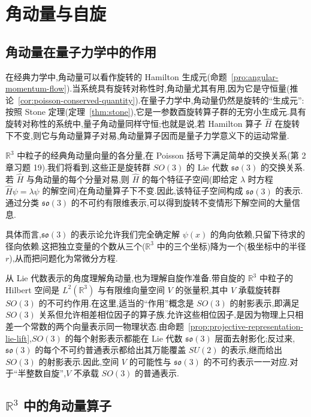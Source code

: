 \chapter{角动量与自旋}
\label{chap:angular-momentum-spin}

\section{角动量在量子力学中的作用}
\label{sec:angular-momentum-role}

在经典力学中,角动量可以看作旋转的 Hamilton 生成元(命题~\ref{pro:angular-momentum-flow}).当系统具有旋转对称性时,角动量尤其有用,因为它是守恒量(推论~\ref{cor:poisson-conserved-quantity}).在量子力学中,角动量仍然是旋转的“生成元”:按照 Stone 定理(定理~\ref{thm:stone}),它是一参数酉旋转算子群的无穷小生成元.具有旋转对称性的系统中,量子角动量同样守恒;也就是说,若 Hamilton 算子 $\widehat H$ 在旋转下不变,则它与角动量算子对易,角动量算子因而是量子力学意义下的运动常量.

$\mathbb R^3$ 中粒子的经典角动量向量的各分量,在 Poisson 括号下满足简单的交换关系(第 2 章习题 19).我们将看到,这些正是旋转群 $SO(3)$ 的 Lie 代数 $\mathfrak{so}(3)$ 的交换关系.若 $\widehat H$ 与角动量的每个分量对易,则 $\widehat H$ 的每个特征子空间(即给定 $\lambda$ 时方程 $\widehat H\psi=\lambda\psi$ 的解空间)在角动量算子下不变.因此,该特征子空间构成 $\mathfrak{so}(3)$ 的表示.通过分类 $\mathfrak{so}(3)$ 的不可约有限维表示,可以得到旋转不变情形下解空间的大量信息.

具体而言,$\mathfrak{so}(3)$ 的表示论允许我们完全确定解 $\psi(x)$ 的角向依赖,只留下待求的径向依赖.这把独立变量的个数从三个($\mathbb R^3$ 中的三个坐标)降为一个(极坐标中的半径 $r$),从而把问题化为常微分方程.

从 Lie 代数表示的角度理解角动量,也为理解自旋作准备.带自旋的 $\mathbb R^3$ 中粒子的 Hilbert 空间是 $L^2(\mathbb R^3)$ 与有限维向量空间 $V$ 的张量积,其中 $V$ 承载旋转群 $SO(3)$ 的不可约作用.在这里,适当的“作用”概念是 $SO(3)$ 的射影表示,即满足 $SO(3)$ 关系但允许相差相位因子的算子族.允许这些相位因子,是因为物理上只相差一个常数的两个向量表示同一物理状态.由命题~\ref{prop:projective-representation-lie-lift},$SO(3)$ 的每个射影表示都能在 Lie 代数 $\mathfrak{so}(3)$ 层面去射影化;反过来,$\mathfrak{so}(3)$ 的每个不可约普通表示都给出其万能覆盖 $SU(2)$ 的表示,继而给出 $SO(3)$ 的射影表示.因此,空间 $V$ 的可能性与 $\mathfrak{so}(3)$ 的不可约表示一一对应.对于“半整数自旋”,$V$ 不承载 $SO(3)$ 的普通表示.

\section{$\mathbb R^3$ 中的角动量算子}
\label{sec:angular-momentum-operators}
\label{sec:angular-momentum}

